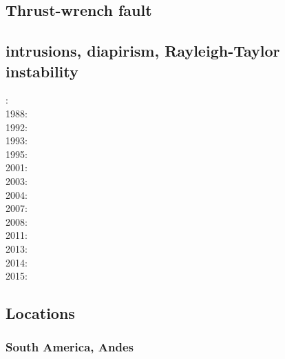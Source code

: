\noindent
\cite{koon94}
\cite{wiep03}
\cite{rugb14}
\cite{mauw16}
\cite{mauw17}\cite{rugb17}
\cite{elgb19}

\subsection*{Thrust-wrench fault} 

\noindent
\cite{rods15}

\subsection*{intrusions, diapirism, Rayleigh-Taylor instability}

: \cite{brpo81}\\
1988: \cite{sccm88}\\
1992: \cite{vayv92}\cite{zaju92}\cite{wein92}\cite{wesc92}\cite{veja92}\\
1993: \cite{kesb93}\cite{nabr93}\cite{potp93}\cite{povp93}\cite{vasv93}\cite{pocp93}\cite{popt93}\cite{wein93}\\
1995: \cite{wepo95}\cite{bisc95}\cite{wepo95}\\
2001: \cite{kapo01}\\
2003: \cite{geur03}\cite{vavs03}\\
2004: \cite{gepm04}\cite{istt04}\cite{geur04}\\
2007: \cite{gebu07}\\
2008: \cite{buge08}\cite{zlfd08}\cite{mohc98}\\
2011: \cite{ellw11}\cite{pege11}\\
2013: \cite{fusc13}\\
2014: \cite{feka14b}\\
2015: \cite{feka15}\cite{fuks15}


\subsection*{Locations}


\subsubsection*{South America, Andes} 


